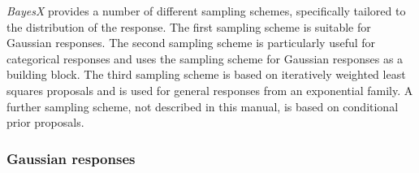 \documentclass[11pt,a4paper,twoside]{bayesxarticle}
\begin{document}
{\em BayesX} provides a number of different sampling schemes,
specifically tailored to the distribution of the response. The first
sampling scheme is suitable for Gaussian responses. The second
sampling scheme is particularly useful for categorical responses and
uses the sampling scheme for Gaussian responses as a building block.
The third sampling scheme is based on iteratively weighted least
squares proposals and is used for general responses from an
exponential family. A further sampling scheme, not described in this
manual, is based on conditional prior proposals.

\subsubsection{Gaussian responses}
\label{gaussianresp} 
\end{document}
